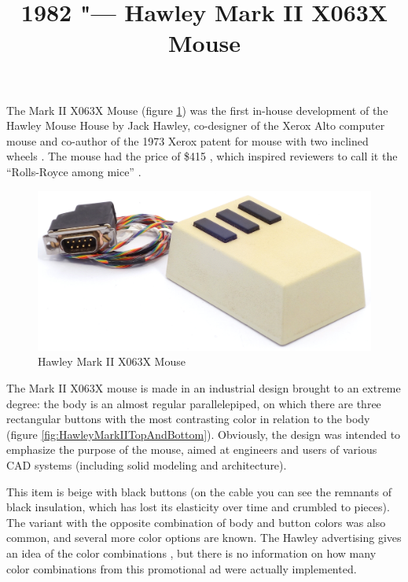 \documentclass[11pt, a4paper]{article}
\begin{document}
\title{1982 "--- Hawley Mark II X063X Mouse}
\date{}
\maketitle
{}
The Mark II X063X Mouse (figure \ref{fig:HawleyMarkIIPic}) was the first in-house development of the Hawley Mouse House \cite{hawley,mouses} by Jack Hawley, co-designer of the Xerox Alto computer mouse and co-author of the 1973 Xerox patent for mouse with two inclined wheels \cite{pat}. The mouse had the price of \$415 \cite{buxton}, which inspired reviewers to call it the ``Rolls-Royce among mice'' \cite{buxton}.

\begin{figure}[h]
   \centering
    \includegraphics[scale=0.6]{1983_hawley_mark_ii/pic_60.jpg}
    \caption{Hawley Mark II X063X Mouse}
    \label{fig:HawleyMarkIIPic}
\end{figure}

The Mark II X063X mouse is made in an industrial design brought to an extreme degree: the body is an almost regular parallelepiped, on which there are three rectangular buttons with the most contrasting color in relation to the body (figure \ref{fig:HawleyMarkIITopAndBottom}). Obviously, the design was intended to emphasize the purpose of the mouse, aimed at engineers and users of various CAD systems (including solid modeling and architecture).

This item is beige with black buttons (on the cable you can see the remnants of black insulation, which has lost its elasticity over time and crumbled to pieces). The variant with the opposite combination of body and button colors was also common, and several more color options are known. The Hawley advertising gives an idea of the color combinations \cite{brochure}, but there is no information on how many color combinations from this promotional ad were actually implemented.
\end{document}
